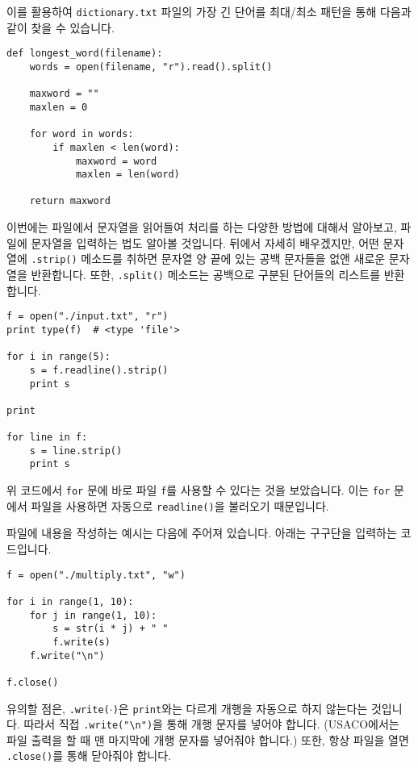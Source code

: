 \documentclass[../main.tex]{subfiles}
\begin{document}
이를 활용하여 \texttt{dictionary.txt} 파일의 가장 긴 단어를 최대/최소 패턴을 통해 다음과 같이 찾을 수 있습니다.
\begin{verbatim}
def longest_word(filename):
	words = open(filename, "r").read().split()
	
	maxword = ""
	maxlen = 0
	
	for word in words:
		if maxlen < len(word):
			maxword = word
			maxlen = len(word)

	return maxword
\end{verbatim}

이번에는 파일에서 문자열을 읽어들여 처리를 하는 다양한 방법에 대해서 알아보고, 파일에 문자열을 입력하는 법도 알아볼 것입니다.
뒤에서 자세히 배우겠지만, 어떤 문자열에 \texttt{.strip()} 메소드를 취하면 문자열 양 끝에 있는 공백 문자들을 없앤 새로운 문자열을 반환합니다.
또한, \texttt{.split()} 메소드는 공백으로 구분된 단어들의 리스트를 반환합니다.
\begin{verbatim}
f = open("./input.txt", "r")
print type(f)  # <type 'file'>

for i in range(5):
	s = f.readline().strip()
	print s

print

for line in f:
	s = line.strip()
	print s
\end{verbatim}
위 코드에서 \texttt{for} 문에 바로 파일 \texttt{f}를 사용할 수 있다는 것을 보았습니다.
이는 \texttt{for} 문에서 파일을 사용하면 자동으로 \texttt{readline()}을 불러오기 때문입니다.

파일에 내용을 작성하는 예시는 다음에 주어져 있습니다.
아래는 구구단을 입력하는 코드입니다.
\begin{verbatim}
f = open("./multiply.txt", "w")

for i in range(1, 10):
	for j in range(1, 10):
		s = str(i * j) + " "
		f.write(s)
	f.write("\n")

f.close()
\end{verbatim}
유의할 점은, \texttt{.write($\cdot$)}은 \texttt{print}와는 다르게 개행을 자동으로 하지 않는다는 것입니다.
따라서 직접 \texttt{.write("\textbackslash n")}을 통해 개행 문자를 넣어야 합니다.
(USACO에서는 파일 출력을 할 때 맨 마지막에 개행 문자를 넣어줘야 합니다.)
또한, 항상 파일을 열면 \texttt{.close()}를 통해 닫아줘야 합니다.
\end{document}
